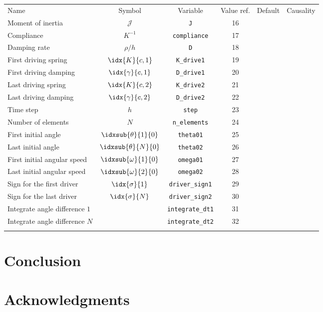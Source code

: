 \documentclass[10pt,notitlepage,abstracton]{scrartcl}
\theoremstyle{plain}
\theoremstyle{plain}
\theoremstyle{plain}
\begin{document}
\begin{tabularx}{1.0\linewidth}[H]{ ||X||c|c|c|c|c|| }
  \hhline{|======|}
  Name & Symbol & Variable & Value ref.  & Default & Causality\\
  \hhline{|======|}
  Moment of inertia & $\mathcal{J}$
                &\texttt{J} & 16 &&\\ \hline
  Compliance & $K^{-1}$
                &\texttt{compliance} & 17 &&\\ \hline
  Damping rate & $\rho/h$
                &\texttt{D} & 18 &&\\ \hline
  First driving spring & $\idx{K}{c,1}$
                &\texttt{K\_drive1} & 19 &&\\ \hline
  First driving damping & $\idx{\gamma}{c,1}$
                &\texttt{D\_drive1} & 20 &&\\ \hline
  Last driving spring & $\idx{K}{c,2}$
                &\texttt{K\_drive2} & 21 &&\\ \hline
  Last driving damping & $\idx{\gamma}{c,2}$
                &\texttt{D\_drive2} & 22 &&\\ \hline
  Time step & $h$
                &\texttt{step} & 23 &&\\ \hline
  Number of elements & $N$
                &\texttt{n\_elements} & 24 &&\\ \hline
  First initial angle & $\idxsub{\theta}{1}{0}$
                &\texttt{theta01} & 25 &&\\ \hline
  Last initial angle & $\idxsub{\theta}{N}{0}$
                &\texttt{theta02} & 26 &&\\ \hline
  First initial angular speed & $\idxsub{\omega}{1}{0}$
                &\texttt{omega01} & 27 &&\\ \hline
  Last initial angular speed & $\idxsub{\omega}{2}{0}$
                &\texttt{omega02} & 28 &&\\ \hline
  Sign for the first driver & $\idx{\sigma}{1}$
                &\texttt{driver\_sign1} & 29 &&\\ \hline
  Sign for the last driver & $\idx{\sigma}{N}$
                &\texttt{driver\_sign2} & 30 &&\\ \hline
  Integrate angle difference $1$& 
                &\texttt{integrate\_dt1} & 31 &&\\ \hline
  Integrate angle difference $N$& 
                &\texttt{integrate\_dt2} & 32 &&\\ \hline
\hhline{|======|}
\end{tabularx}
\section{Conclusion}

\label{sec:conclusion}

\section*{Acknowledgments}
\label{sec:acknowledgments}


  

\end{document}
